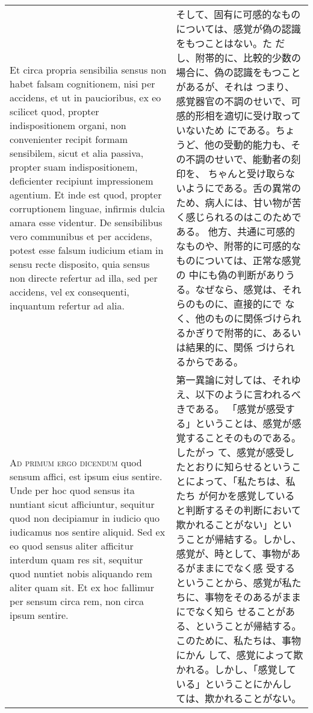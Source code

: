 \documentclass[10pt]{jsarticle} %
\begin{document}
\begin{longtable}{p{21em}p{21em}}
\\



Et circa propria sensibilia sensus
non habet falsam cognitionem, nisi per accidens, et ut in paucioribus,
ex eo scilicet quod, propter indispositionem organi, non convenienter
recipit formam sensibilem, sicut et alia passiva, propter suam
indispositionem, deficienter recipiunt impressionem agentium. Et inde
est quod, propter corruptionem linguae, infirmis dulcia amara esse
videntur. De sensibilibus vero communibus et per accidens, potest esse
falsum iudicium etiam in sensu recte disposito, quia sensus non directe
refertur ad illa, sed per accidens, vel ex consequenti, inquantum
refertur ad alia.


&

そして、固有に可感的なものについては、感覚が偽の認識をもつことはない。た
 だし、附帯的に、比較的少数の場合に、偽の認識をもつことがあるが、それは
 つまり、感覚器官の不調のせいで、可感的形相を適切に受け取っていないため
 にである。ちょうど、他の受動的能力も、その不調のせいで、能動者の刻印を、
 ちゃんと受け取らないようにである。舌の異常のため、病人には、甘い物が苦
 く感じられるのはこのためである。
他方、共通に可感的なものや、附帯的に可感的なものについては、正常な感覚の
 中にも偽の判断がありうる。なぜなら、感覚は、それらのものに、直接的にで
 なく、他のものに関係づけられるかぎりで附帯的に、あるいは結果的に、関係
 づけられるからである。


\\


{\scshape Ad primum ergo dicendum} quod sensum affici, est ipsum eius
sentire. Unde per hoc quod sensus ita nuntiant sicut afficiuntur,
sequitur quod non decipiamur in iudicio quo iudicamus nos sentire
aliquid. Sed ex eo quod sensus aliter afficitur interdum quam res sit,
sequitur quod nuntiet nobis aliquando rem aliter quam sit. Et ex hoc
fallimur per sensum circa rem, non circa ipsum sentire.


&


第一異論に対しては、それゆえ、以下のように言われるべきである。
「感覚が感受する」ということは、感覚が感覚することそのものである。したがっ
 て、感覚が感受したとおりに知らせるということによって、「私たちは、私たち
 が何かを感覚していると判断するその判断において欺かれることがない」とい
 うことが帰結する。しかし、感覚が、時として、事物があるがままにでなく感
 受するということから、感覚が私たちに、事物をそのあるがままにでなく知ら
 せることがある、ということが帰結する。このために、私たちは、事物にかん
 して、感覚によって欺かれる。しかし、「感覚している」ということにかんし
 ては、欺かれることがない。


\end{longtable}
\end{document}
